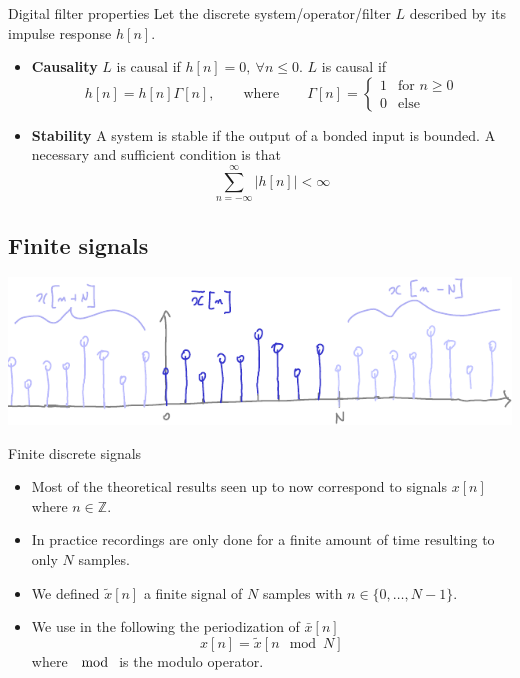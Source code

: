 \begin{block}{Digital filter properties}
  Let the discrete system/operator/filter $L$ described by its impulse response $h[n]$.
  \begin{itemize}
      \item \textbf{Causality} $L$ is causal if $h[n]=0,\ \forall n\leq 0$. $L$ is causal if 
   \begin{equation}
          h[n]=h[n]\Gamma[n],\qquad\text{where}\qquad     \Gamma[n]=
          \begin{cases}
              1& \text{for } n\geq 0\\
              0 & \text{else}
            \end{cases}
          \label{eq:causal_discrete}
      \end{equation}
      \item \textbf{Stability} A system is stable if the output of a bonded input is bounded. A necessary and sufficient condition is that
      \begin{equation}
          \sum_{n=-\infty}^\infty |h[n]|<\infty
          \label{eq:stable_system}
      \end{equation}
      
      
  \end{itemize}
  
\end{block}

\subsection{Finite signals}
\label{sec:finite}


\begin{center}
  \includegraphics[width=.8\linewidth]{imgs/sig_conv/finite_discrete-crop.pdf}
\end{center}

\begin{block}{Finite discrete signals}
  \begin{itemize}
      \item Most of the theoretical results seen up to now correspond to signals $x[n]$ where $n\in\mathbb{Z}$.
      \item In practice recordings are only done for a finite amount of time resulting to only $N$ samples. 
      \item We defined $\tilde x[n]$ a finite signal of $N$ samples with $n\in \{0,\dots,N-1\}$.
      \item We use in the following the periodization of $\bar x[n]$
      $$ x[n] = \tilde x[n\mod N] $$
      where $\mod$ is the modulo operator.
  \end{itemize}
\end{block}

